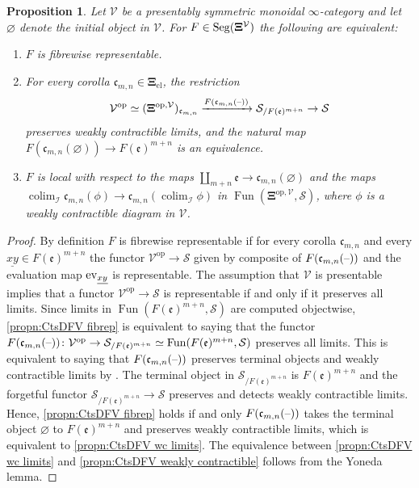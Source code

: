 \documentclass{amsart}
\numberwithin{theorem}{subsection}
\newtheorem{propn}[theorem]{Proposition}
\theoremstyle{definition}
\providecommand{\op}{\mathrm{op}}
\providecommand{\xel}{\mathrm{el}}
\newcommand{\xFun}{\operatorname{Fun}}
\DeclareMathOperator*{\colim}{colim}
\newcommand{\xS}{\mathcal{S}}
\newcommand{\xV}{\mathcal{V}}
\newcommand{\xfe}{\mathfrak{e}}
\newcommand{\xfc}{\mathfrak{c}}
\newcommand{\name}[1]{\ensuremath{\text{\textup{#1}}}}
\newcommand{\gc}{\mathbf{\Xi}}
\newcommand{\gcel}{\gc_{\xel}}
\newcommand{\gcV}{\gc^{\xV}}
\newcommand{\opgcV}{\gc^{\op,\xV}}
\newcommand{\Seg}{\name{Seg}}
\newcommand{\blank}{\text{\textendash}}
\begin{document}
\begin{propn}\label{propn:CtsDFV}
	Let $\xV$ be a presentably symmetric monoidal $\infty$-category and let $\varnothing$ denote the initial object in $\xV$. For $F\in \Seg(\gcV)$ the following are equivalent:
	\begin{enumerate}
		\item $F$ is fibrewise representable.
	\label{propn:CtsDFV fibrep}
		\item For every corolla $\xfc_{m,n}\in \gcel$, the restriction \[ \xV^{\op}
		\simeq (\opgcV)_{\xfc_{m,n}} \xrightarrow{F(\xfc_{m,n}(\blank))} \xS_{/F(\xfe)^{m+n}} \to \xS\]
		preserves weakly contractible limits, and the natural map $F(\xfc_{m,n}(\varnothing)) \to
		F(\xfe)^{m+n}$ is an equivalence.
	\label{propn:CtsDFV wc limits}
		\item $F$ is local with respect to the maps $\coprod_{m+n}
		\xfe \to \xfc_{m,n}(\varnothing)$ and the maps $\colim_{\mathcal{I}}\xfc_{m,n}(\phi) \to
		\xfc_{m,n}(\colim_{\mathcal{I}} \phi)$ in $\xFun(\opgcV,\xS)$, where $\phi$ is a weakly contractible diagram in $\xV$.\label{propn:CtsDFV weakly contractible}
	\end{enumerate}
\end{propn}
\begin{proof}
	By definition $F$ is fibrewise representable if for every corolla $\xfc_{m,n}$ and every $\underline{xy}\in F(\xfe)^{m+n}$ the functor $\xV^\op\to \xS$ given by composite of $F(\xfc_{m,n}(\blank))$ and the evaluation map $\name{ev}_{\underline{xy}}$ is representable. 
	The assumption that $\xV$ is presentable implies that a functor $\xV^\op\to \xS$ is representable if and only if it preserves all limits. Since limits in $\xFun(F(\xfe)^{m+n},\xS)$ are computed objectwise, \eqref{propn:CtsDFV fibrep} is equivalent to saying that the functor $F(\xfc_{m,n}(\blank)) \colon \xV^{\op}\to \xS_{/F(\xfe)^{m+n}}\simeq \xFun(F(\xfe)^{m+n},\xS)$ preserves all limits. 
	This is equivalent to saying that $F(\xfc_{m,n}(\blank))$ preserves terminal objects and weakly contractible limits by \cite[Lemma 2.2.7]{GepnerHaugsengKock:IOAM}. 
	The terminal object in $\xS_{/F(\xfe)^{m+n}}$ is $F(\xfe)^{m+n}$ and the forgetful functor $\xS_{/F(\xfe)^{m+n}}\to \xS$ preserves and detects weakly contractible limits. Hence, \eqref{propn:CtsDFV fibrep} holds if and only $F(\xfc_{m,n}(\blank))$ takes the terminal object $\varnothing$ to $F(\xfe)^{m+n}$ and preserves weakly contractible limits, which is equivalent to \eqref{propn:CtsDFV wc limits}.
	The equivalence between \eqref{propn:CtsDFV wc limits} and \eqref{propn:CtsDFV weakly contractible} follows from the Yoneda lemma. 
\end{proof}
\end{document}
